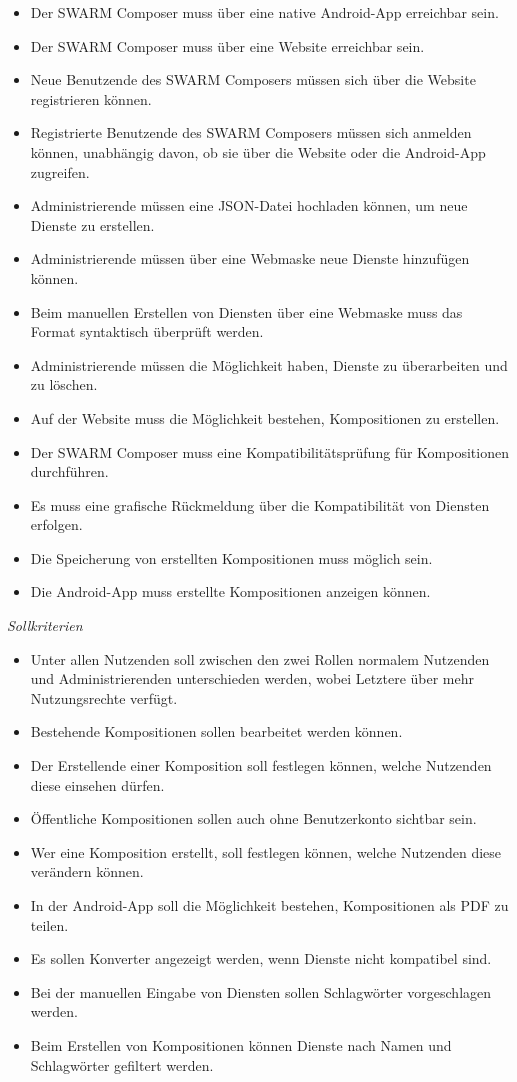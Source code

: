 \begin{itemize}[leftmargin=4pc]
	\item Der SWARM Composer muss über eine native Android-App erreichbar sein.
	\item Der SWARM Composer muss über eine Website erreichbar sein.
	\item Neue Benutzende des SWARM Composers müssen sich über die Website registrieren können.
	\item Registrierte Benutzende des SWARM Composers müssen sich anmelden können, unabhängig davon, ob sie über die Website oder die Android-App zugreifen.
	\item Administrierende müssen eine JSON-Datei hochladen können, um neue Dienste zu erstellen.
	\item Administrierende müssen über eine Webmaske neue Dienste hinzufügen können.
	\item Beim manuellen Erstellen von Diensten über eine Webmaske muss das Format syntaktisch überprüft werden.
	\item Administrierende müssen die Möglichkeit haben, Dienste zu überarbeiten und zu löschen.
	\item Auf der Website muss die Möglichkeit bestehen, Kompositionen zu erstellen.
	\item Der SWARM Composer muss eine Kompatibilitätsprüfung für Kompositionen durchführen.
	\item Es muss eine grafische Rückmeldung über die Kompatibilität von Diensten erfolgen.
	\item Die Speicherung von erstellten Kompositionen muss möglich sein.
	\item Die Android-App muss erstellte Kompositionen anzeigen können.
\end{itemize}

\textit{Sollkriterien}

\begin{itemize}[leftmargin=4pc]
	\item Unter allen Nutzenden soll zwischen den zwei Rollen normalem Nutzenden und Administrierenden unterschieden werden, wobei Letztere über mehr Nutzungsrechte verfügt.
	\item Bestehende Kompositionen sollen bearbeitet werden können.
	\item Der Erstellende einer Komposition soll festlegen können, welche Nutzenden diese einsehen dürfen.
	\item Öffentliche Kompositionen sollen auch ohne Benutzerkonto sichtbar sein.
	\item Wer eine Komposition erstellt, soll festlegen können, welche Nutzenden diese verändern können.
	\item In der Android-App soll die Möglichkeit bestehen, Kompositionen als PDF zu teilen.
	\item Es sollen Konverter angezeigt werden, wenn Dienste nicht kompatibel sind.
	\item Bei der manuellen Eingabe von Diensten sollen Schlagwörter vorgeschlagen werden.
	\item Beim Erstellen von Kompositionen können Dienste nach Namen und Schlagwörter gefiltert werden.
\end{itemize}

